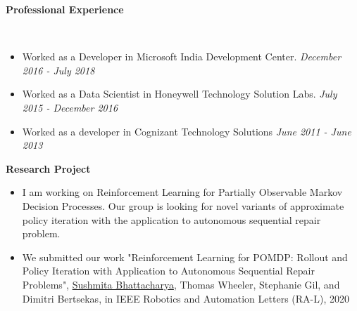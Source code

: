 \documentclass[a4paper,11pt]{article}
\newcommand{\lsep}{-0.5cm}
\newcommand{\resheading}[1]{{\small \colorbox{mygrey}{\begin{minipage}{0.975\textwidth}{\textbf{#1 \vphantom{p\^{E}}}}\end{minipage}}}}
\begin{document}
\resheading{\textbf{\large Professional Experience}}\\[\lsep]
\begin{description}
	\item 
	\begin{itemize}
		\item Worked as a Developer in Microsoft India Development Center. \hfill \textit{December 2016 - July 2018}
	\end{itemize}
\item 
\begin{itemize}
		\item Worked as a Data Scientist in Honeywell Technology Solution Labs. \hfill \textit{July 2015 - December 2016}
	\end{itemize}
	\item 
	\begin{itemize}
		\item Worked as a developer in Cognizant Technology Solutions \hfill \textit{June 2011 - June 2013}
	\end{itemize}
\end{description}

\resheading{\textbf{\large Research Project}}
\begin{description}
	
	\item 
	\begin{itemize}
		\item I am working on Reinforcement Learning for Partially Observable Markov Decision Processes. Our group is looking for novel variants of approximate policy iteration with the application to autonomous sequential repair problem. 
	\end{itemize}
\item 
\begin{itemize}
	\item	We submitted our work "Reinforcement Learning for POMDP: Rollout and Policy Iteration with Application to Autonomous Sequential Repair Problems", \underline{Sushmita Bhattacharya}, Thomas Wheeler, Stephanie Gil, and Dimitri Bertsekas, in IEEE Robotics and Automation Letters (RA-L), 2020
	\end{itemize}
\end{description}
\end{document}
